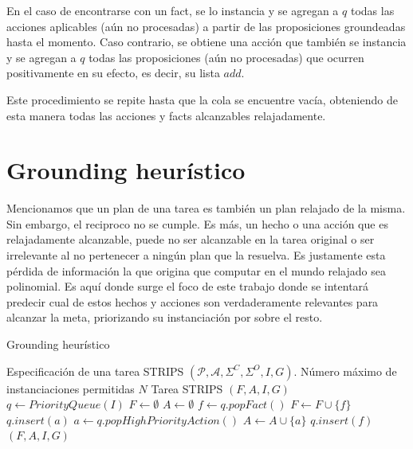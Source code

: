 En el caso de encontrarse con un fact, se lo instancia y se agregan a $q$ todas
las acciones aplicables (aún no procesadas) a partir de las proposiciones
groundeadas hasta el momento. Caso contrario, se obtiene una acción que también
se instancia y se agregan a $q$ todas las proposiciones (aún no procesadas) que
ocurren positivamente en su efecto, es decir, su lista $add$.

Este procedimiento se repite hasta que la cola se encuentre vacía, obteniendo de esta manera todas las acciones y facts alcanzables relajadamente.

\section{Grounding heurístico}
\label{lit:heuristic_grounding}

Mencionamos que un plan de una tarea es también un plan relajado de la misma.
Sin embargo, el reciproco no se cumple. Es más, un hecho o una acción que es
relajadamente alcanzable, puede no ser alcanzable en la tarea original o ser
irrelevante al no pertenecer a ningún plan que la resuelva. Es justamente esta
pérdida de información la que origina que computar en el mundo relajado sea
polinomial. Es aquí donde surge el foco de este trabajo donde se intentará
predecir cual de estos hechos y acciones son verdaderamente relevantes para
alcanzar la meta, priorizando su instanciación por sobre el resto.

\begin{algorithm}
    \caption{Grounding heurístico}\label{alg:grounding-heuristico}
    \begin{algorithmic}[1]
    \Require Especificación de una tarea STRIPS $(\mathcal{P}, \mathcal{A}, \Sigma^{C}, \Sigma^{O}, I, G)$. Número máximo de instanciaciones permitidas $N$
    \Ensure Tarea STRIPS $(F, A, I, G)$
    \State $q \gets PriorityQueue(I)$
    \State $F \gets \emptyset$
    \State $A \gets \emptyset$
        \State $f \gets q.popFact()$
        \State $F \gets F \cup \{f\}$
            \State $q.insert(a)$
        \EndFor
    \Else
        \State $a \gets q.popHighPriorityAction()$
        \State $A \gets A \cup \{a\}$
            \State $q.insert(f)$
        \EndFor
    \EndIf
    \EndWhile
    \State \Return $(F, A, I, G)$
    \end{algorithmic}
\end{algorithm}

